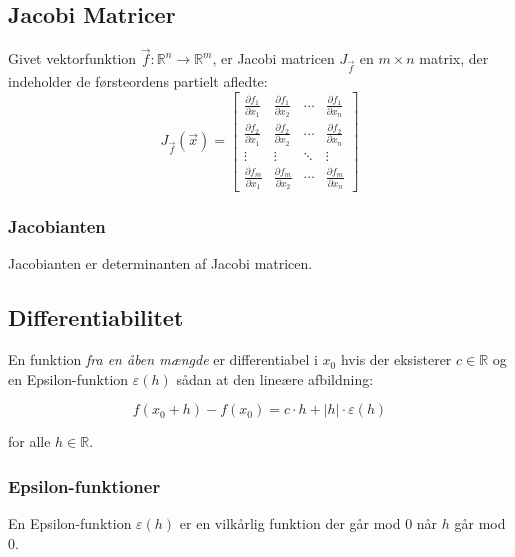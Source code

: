 
\subsection{Jacobi Matricer}
Givet vektorfunktion $\vec f: \mathbb{R}^n \to \mathbb{R}^m$, er Jacobi matricen $J_{\vec f}$ en $m \times n$ matrix, der indeholder de førsteordens partielt afledte:
\begingroup
\renewcommand*{\arraystretch}{1.5}
\[
    J_{\vec f}(\vec x) = \begin{bmatrix}
        \frac{\partial f_1}{\partial x_1} & \frac{\partial f_1}{\partial x_2} & \cdots & \frac{\partial f_1}{\partial x_n} \\
        \frac{\partial f_2}{\partial x_1} & \frac{\partial f_2}{\partial x_2} & \cdots & \frac{\partial f_2}{\partial x_n} \\
        \vdots & \vdots & \ddots & \vdots \\
        \frac{\partial f_m}{\partial x_1} & \frac{\partial f_m}{\partial x_2} & \cdots & \frac{\partial f_m}{\partial x_n}
    \end{bmatrix}
\]
\endgroup

\subsubsection{Jacobianten}
Jacobianten er determinanten af Jacobi matricen.

\subsection{Differentiabilitet}
En funktion \emph{fra en åben mængde} er differentiabel i $x_0$ hvis der eksisterer
$c \in \mathbb{R}$ og en Epsilon-funktion $\varepsilon(h)$ sådan at den lineære afbildning:

\[
    f(x_0+h) - f(x_0) = c \cdot h + |h| \cdot \varepsilon(h) 
\]

for alle $h \in \mathbb{R}$.


\subsubsection{Epsilon-funktioner}
En Epsilon-funktion $\varepsilon(h)$ er en vilkårlig funktion der går mod 0 når $h$ går mod 0.